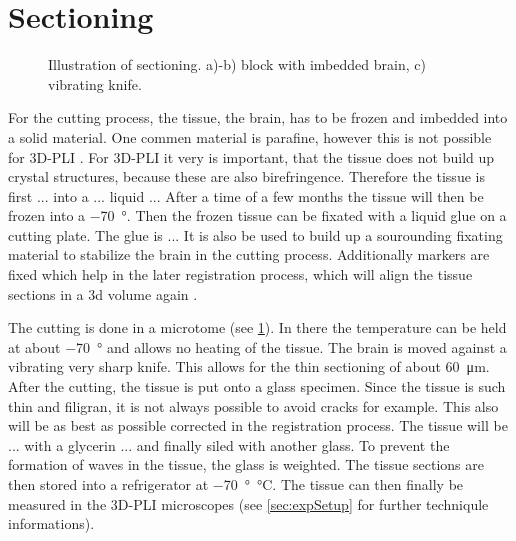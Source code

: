 \section{Sectioning}
%
\begin{figure}[!t]
	\centering
    \setlength{\tikzwidth}{0.75\textwidth}
	\caption{Illustration of sectioning. a)-b) block with imbedded brain, c) vibrating knife.}
	\label{fig:brain_sectioning}
\end{figure}
% 
For the cutting process, the tissue, \ie{} the brain, has to be frozen and imbedded into a solid material.
One commen material is parafine, however this is not possible for \ac{3D-PLI} \dummy[why?]{}.
For \ac{3D-PLI} it very is important, that the tissue does not build up crystal structures, because these are also birefringence.
Therefore the tissue is first ... into a ... liquid ...
After a time of a few months the tissue will then be frozen into a \SI{-70}{\degree}.
Then the frozen tissue can be fixated with a liquid glue on a cutting plate.
The glue is ...
It is also be used to build up a sourounding fixating material to stabilize the brain in the cutting process.
Additionally markers are fixed which help in the later registration process, which will align the tissue sections in a 3d volume again \cite{Schober2016,Ali2018,Schmitz2018}.
\par
The cutting is done in a microtome (see \cref{fig:brain_sectioning}).
In there the temperature can be held at about \SI{-70}{\degree} and allows no heating of the tissue.
The brain is moved against a vibrating very sharp knife.
This allows for the thin sectioning of about \SI{60}{\micro\meter}.
After the cutting, the tissue is put onto a glass specimen.
Since the tissue is such thin and filigran, it is not always possible to avoid cracks for example.
This also will be as best as possible corrected in the registration process.
The tissue will be ... with a glycerin ... and finally siled with another glass.
To prevent the formation of waves in the tissue, the glass is weighted.
The tissue sections are then stored into a refrigerator at \SI{-70}{\degree\celsius}.
The tissue can then finally be measured in the \ac{3D-PLI} microscopes (see \cref{sec:expSetup} for further techniqule informations).
% 
% 
